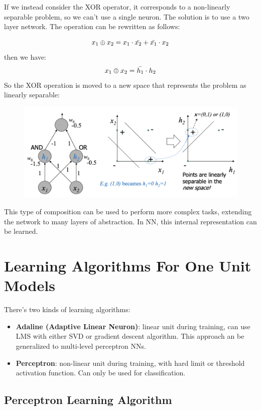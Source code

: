 If we instead consider the XOR operator, it corresponds to a non-linearly separable problem, so we can't use a single neuron. The solution is to use a two layer network. The operation can be rewritten as follows:

\begin{equation*}
    x_1 \oplus x_2 = x_1 \cdot \Bar{x_2} + \Bar{x_1} \cdot x_2
\end{equation*}
then we have:
\begin{equation*}
    x_1 \oplus x_2 = \Bar{h_1} \cdot h_2
\end{equation*}
So the XOR operation is moved to a new space that represents the problem as linearly separable:
\begin{figure}[ht]
    \centering
    \includegraphics[width=0.55\linewidth]{img/xor perceptron.png}
\end{figure}
This type of composition can be used to perform more complex tasks, extending the network to many layers of abstraction. In NN, this internal representation can be learned.

\section{Learning Algorithms For One Unit Models}

There's two kinds of learning algorithms:
\begin{itemize}
    \item \textbf{Adaline (Adaptive Linear Neuron)}: linear unit during training, can use LMS with either SVD or gradient descent algorithm. This approach an be generalized to multi-level perceptron NNs.

    \item \textbf{Perceptron}: non-linear unit during training, with hard limit or threshold activation function. Can only be used for classification.
\end{itemize}

\subsection{Perceptron Learning Algorithm}

